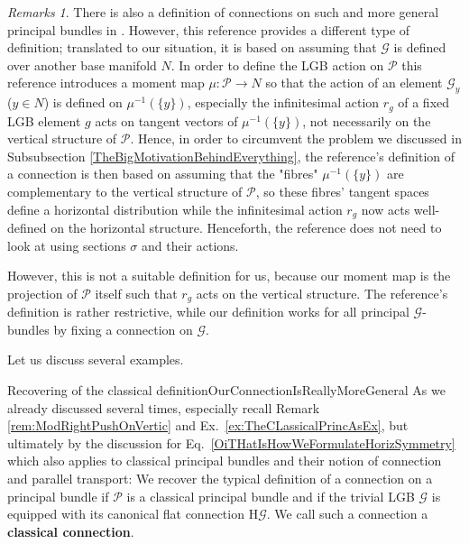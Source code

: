 \documentclass[a4paper,oneside,11pt,bibliography=totoc]{scrartcl}
\theoremstyle{plain}
\theoremstyle{remark}
\newtheorem{remark}[theorem]{Remarks}
\theoremstyle{definition}
\begin{document}
\begin{remark}
\leavevmode\newline
There is also a definition of connections on such and more general principal bundles in \cite[\S 5.7, paragraph before Prop.\ 5.38, page 148]{GroupoidBasedPrincipalBundles}. However, this reference provides a different type of definition; translated to our situation, it is based on assuming that $\mathcal{G}$ is defined over another base manifold $N$. In order to define the LGB action on $\mathcal{P}$ this reference introduces a moment map $\mu: \mathcal{P} \to N$ so that the action of an element $\mathcal{G}_y$ ($y \in N$) is defined on $\mu^{-1}(\{y\})$, especially the infinitesimal action $r_g$ of a fixed LGB element $g$ acts on tangent vectors of $\mu^{-1}(\{y\})$, not necessarily on the vertical structure of $\mathcal{P}$. Hence, in order to circumvent the problem we discussed in Subsubsection \ref{TheBigMotivationBehindEverything}, the reference's definition of a connection is then based on assuming that the "fibres" $\mu^{-1}(\{y\})$ are complementary to the vertical structure of $\mathcal{P}$, so these fibres' tangent spaces define a horizontal distribution while the infinitesimal action $r_g$ now acts well-defined on the horizontal structure. Henceforth, the reference does not need to look at using sections $\sigma$ and their actions.

However, this is not a suitable definition for us, because our moment map is the projection of $\mathcal{P}$ itself such that $r_g$ acts on the vertical structure. The reference's definition is rather restrictive, while our definition works for all principal $\mathcal{G}$-bundles by fixing a connection on $\mathcal{G}$.
\end{remark}

Let us discuss several examples.

\begin{examples}{Recovering of the classical definition}{OurConnectionIsReallyMoreGeneral}
As we already discussed several times, especially recall Remark \ref{rem:ModRightPushOnVertic} and Ex.\ \ref{ex:TheCLassicalPrincAsEx}, but ultimately by the discussion for Eq.\ \eqref{OiTHatIsHowWeFormulateHorizSymmetry} which also applies to classical principal bundles and their notion of connection and parallel transport: We recover the typical definition of a connection on a principal bundle if $\mathcal{P}$ is a classical principal bundle and if the trivial LGB $\mathcal{G}$ is equipped with its canonical flat connection $\mathrm{H}\mathcal{G}$. We call such a connection a \textbf{classical connection}.
\end{examples}
\end{document}
